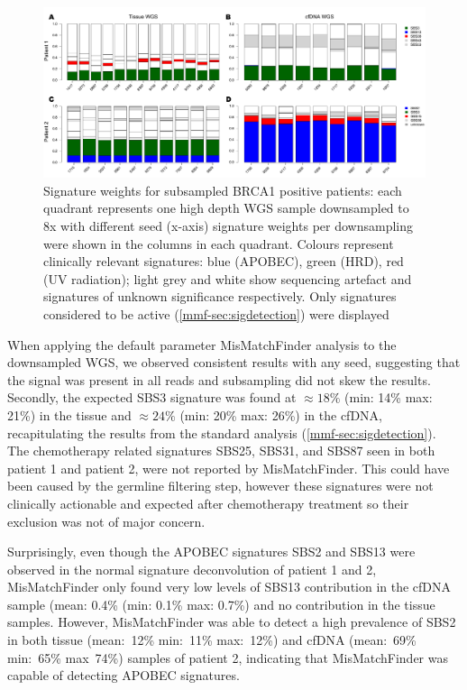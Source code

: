 \begin{figure}[hb]
\centering
\includegraphics[width=.99\linewidth]{Figures/MisMatchFinder/brca1BarPlots.pdf}
\caption[Signature weights for subsampled BRCA1 positive patients]{Signature weights for subsampled BRCA1 positive patients: each quadrant represents one high depth WGS sample downsampled to 8x with different seed (x-axis) signature weights per downsampling were shown in the columns in each quadrant. Colours represent clinically relevant signatures: blue (APOBEC), green (HRD), red (UV radiation); light grey and white show sequencing artefact and signatures of unknown significance respectively. Only signatures considered to be active (\autoref{mmf-sec:sigdetection}) were displayed}\label{fig:mmf-mbcbBarPlot}
\end{figure}

When applying the default parameter MisMatchFinder analysis to the downsampled WGS, we observed consistent results with any seed, suggesting that the signal was present in all reads and subsampling did not skew the results. Secondly, the expected SBS3 signature was found at $\approx 18\%$ (min: 14\% max: 21\%) in the tissue and $\approx 24\%$ (min: 20\% max: 26\%) in the cfDNA, recapitulating the results from the standard analysis (\autoref{mmf-sec:sigdetection}). The chemotherapy related signatures SBS25, SBS31, and SBS87 seen in both patient 1 and patient 2, were not reported by MisMatchFinder. This could have been caused by the germline filtering step, however these signatures were not clinically actionable and expected after chemotherapy treatment so their exclusion was not of major concern.

Surprisingly, even though the APOBEC signatures SBS2 and SBS13 were observed in the normal signature deconvolution of patient 1 and 2, MisMatchFinder only found very low levels of SBS13 contribution in the cfDNA sample (mean: 0.4\% (min: 0.1\% max: 0.7\%) and no contribution in the tissue samples. However, MisMatchFinder was able to detect a high prevalence of SBS2 in both tissue (mean:~12\% min:~11\% max:~12\%) and cfDNA (mean:~69\% min:~65\% max~74\%) samples of patient 2, indicating that MisMatchFinder was capable of detecting APOBEC signatures. 

